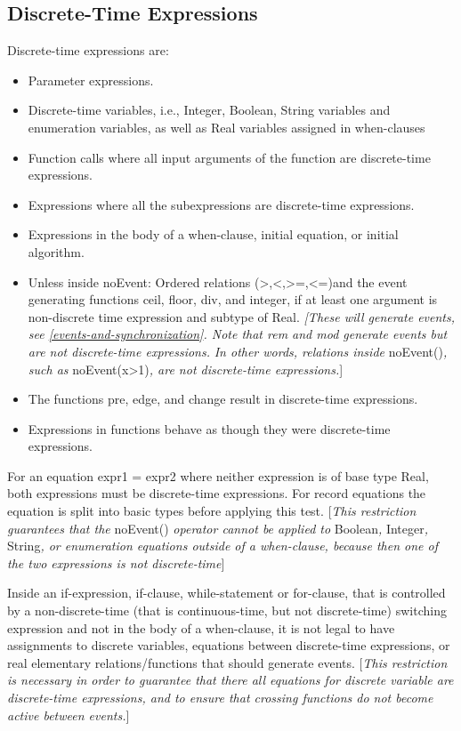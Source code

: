 \documentclass[10pt,a4paper]{report}
\def\doublelabel#1{\label{#1}}
\begin{document}
\subsection{Discrete-Time Expressions}\doublelabel{discrete-time-expressions}

Discrete-time expressions are:

\begin{itemize}
\item
  Parameter expressions.
\item
  Discrete-time variables, i.e., Integer, Boolean, String variables and
  enumeration variables, as well as Real variables assigned in
  when-clauses
\item
  Function calls where all input arguments of the function are
  discrete-time expressions.
\item
  Expressions where all the subexpressions are discrete-time
  expressions.
\item
  Expressions in the body of a when-clause, initial equation, or initial
  algorithm.
\item
  Unless inside noEvent: Ordered relations
  (\textgreater{},\textless{},\textgreater{}=,\textless{}=)and the event
  generating functions ceil, floor, div, and integer, if at least one
  argument is non-discrete time expression and subtype of Real.
  \emph{{[}These will generate events, see \ref{events-and-synchronization}. Note that
  rem and mod generate events but are not discrete-time expressions.}
  \emph{In other words, relations inside} noEvent()\emph{, such as}
  noEvent(x\textgreater{}1)\emph{, are not discrete-time
  expressions.}{]}
\item
  The functions pre, edge, and change result in discrete-time
  expressions.
\item
  Expressions in functions behave as though they were discrete-time
  expressions.
\end{itemize}

For an equation expr1 = expr2 where neither expression is of base type
Real, both expressions must be discrete-time expressions. For record
equations the equation is split into basic types before applying this
test. {[}\emph{This restriction guarantees that the} noEvent()
\emph{operator cannot be applied to} Boolean\emph{,} Integer\emph{,}
String\emph{, or enumeration equations outside of a when-clause, because
then one of the two expressions is not discrete-time}{]}

Inside an if-expression, if-clause, while-statement or for-clause, that
is controlled by a non-discrete-time (that is continuous-time, but not
discrete-time) switching expression and not in the body of a
when-clause, it is not legal to have assignments to discrete variables,
equations between discrete-time expressions, or real elementary
relations/functions that should generate events. {[}\emph{This
restriction is necessary in order to guarantee that there all equations
for discrete variable are discrete-time expressions, and to ensure that
crossing functions do not become active between events.}{]}
\end{document}
